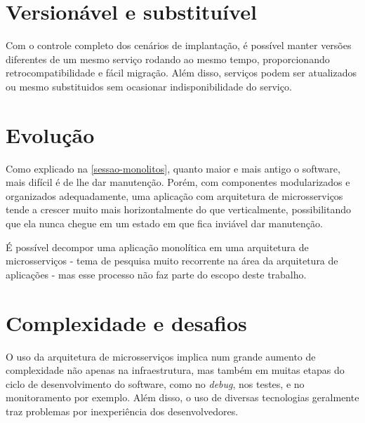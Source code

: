 \section{Versionável e substituível}

Com o controle completo dos cenários de implantação, é possível manter versões diferentes de um mesmo serviço rodando ao mesmo tempo, proporcionando retrocompatibilidade e fácil migração. Além disso, serviços podem ser atualizados ou mesmo substituidos sem ocasionar indisponibilidade do serviço. \cite{Familiar2015}

\section{Evolução}

Como explicado na \autoref{sessao-monolitos}, quanto maior e mais antigo o software, mais difícil é de lhe dar manutenção. Porém, com componentes modularizados e organizados adequadamente, uma aplicação com arquitetura de microsserviços tende a crescer muito mais horizontalmente do que verticalmente, possibilitando que ela nunca chegue em um estado em que fica inviável dar manutenção. 

É possível decompor uma aplicação monolítica em uma arquitetura de microsserviços - tema de pesquisa muito recorrente na área da arquitetura de aplicações - mas esse processo não faz parte do escopo deste trabalho.


\section{Complexidade e desafios}

O uso da arquitetura de microsserviços implica num grande aumento de complexidade não apenas na infraestrutura, mas também em muitas etapas do ciclo de desenvolvimento do software, como no \emph{debug}, nos testes, e no monitoramento por exemplo. Além disso, o uso de diversas tecnologias geralmente traz problemas por inexperiência dos desenvolvedores.

